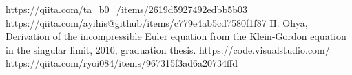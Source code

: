 \documentclass[a4j,12pt]{jreport}
\begin{document}
    \begin{thebibliography}{100}
         https://qiita.com/ta\_b0\_/items/2619d5927492edbb5b03
         https://qiita.com/ayihis@github/items/c779e4ab5cd7580f1f87
         H. Ohya, Derivation of the incompressible Euler equation
        from the Klein-Gordon equation in the singular limit, 2010, graduation thesis.
         https://code.visualstudio.com/
         https://qiita.com/ryoi084/items/967315f3ad6a20734ffd
    \end{thebibliography}
\end{document}
